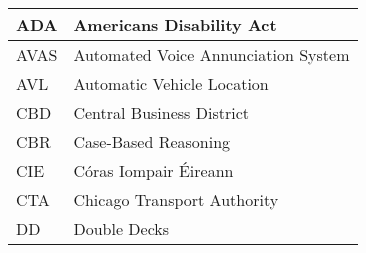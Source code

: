 


\begin{longtable}{p{90pt}l}
    \hline ADA  & Americans Disability Act            \\
    \hline AVAS & Automated Voice Annunciation System \\
    \hline AVL  & Automatic Vehicle Location          \\
    \hline CBD  & Central Business District           \\
    \hline CBR  & Case-Based Reasoning                \\
    \hline CIE  & C\'{o}ras Iompair \'{E}ireann       \\
    \hline CTA  & Chicago Transport Authority         \\
    \hline DD   & Double Decks                        \\

    \hline
\end{longtable}

